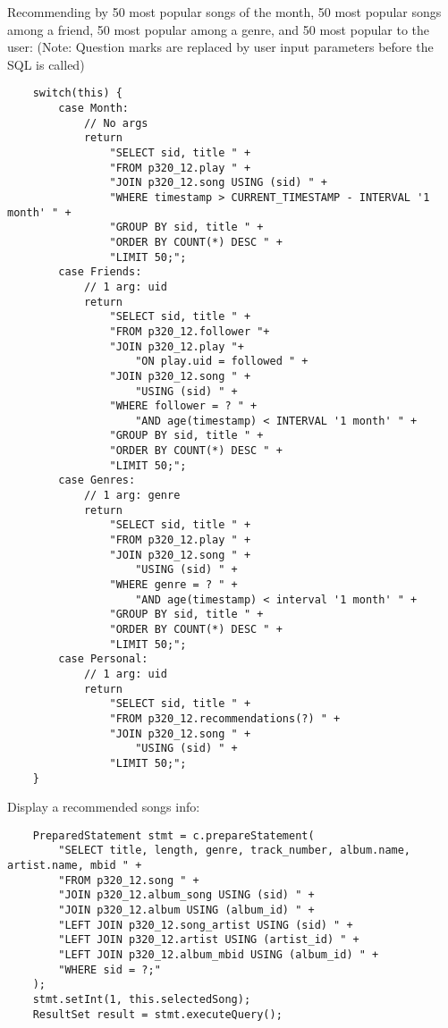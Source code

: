 \documentclass[12pt]{article}
\begin{document}
    Recommending by 50 most popular songs of the month, 50 most popular songs among a friend, 50 most popular among a genre, and 50 most popular to the user:
    (Note: Question marks are replaced by user input parameters before the SQL is called)
    \begin{lstlisting}
    switch(this) {
        case Month:
            // No args
            return
                "SELECT sid, title " +
                "FROM p320_12.play " +
                "JOIN p320_12.song USING (sid) " +
                "WHERE timestamp > CURRENT_TIMESTAMP - INTERVAL '1 month' " +
                "GROUP BY sid, title " +
                "ORDER BY COUNT(*) DESC " +
                "LIMIT 50;";
        case Friends:
            // 1 arg: uid
            return
                "SELECT sid, title " +
                "FROM p320_12.follower "+
                "JOIN p320_12.play "+
                    "ON play.uid = followed " +
                "JOIN p320_12.song " +
                    "USING (sid) " +
                "WHERE follower = ? " +
                    "AND age(timestamp) < INTERVAL '1 month' " +
                "GROUP BY sid, title " +
                "ORDER BY COUNT(*) DESC " +
                "LIMIT 50;";
        case Genres:
            // 1 arg: genre
            return
                "SELECT sid, title " +
                "FROM p320_12.play " +
                "JOIN p320_12.song " +
                    "USING (sid) " +
                "WHERE genre = ? " +
                    "AND age(timestamp) < interval '1 month' " +
                "GROUP BY sid, title " +
                "ORDER BY COUNT(*) DESC " +
                "LIMIT 50;";
        case Personal:
            // 1 arg: uid
            return
                "SELECT sid, title " +
                "FROM p320_12.recommendations(?) " +
                "JOIN p320_12.song " +
                    "USING (sid) " +
                "LIMIT 50;";
    }
    \end{lstlisting}
    
    Display a recommended songs info:
    
    \begin{lstlisting}
    PreparedStatement stmt = c.prepareStatement(
        "SELECT title, length, genre, track_number, album.name, artist.name, mbid " +
        "FROM p320_12.song " +
        "JOIN p320_12.album_song USING (sid) " +
        "JOIN p320_12.album USING (album_id) " +
        "LEFT JOIN p320_12.song_artist USING (sid) " +
        "LEFT JOIN p320_12.artist USING (artist_id) " +
        "LEFT JOIN p320_12.album_mbid USING (album_id) " +
        "WHERE sid = ?;"
    );
    stmt.setInt(1, this.selectedSong);
    ResultSet result = stmt.executeQuery();
    \end{lstlisting}
    
\end{document}
